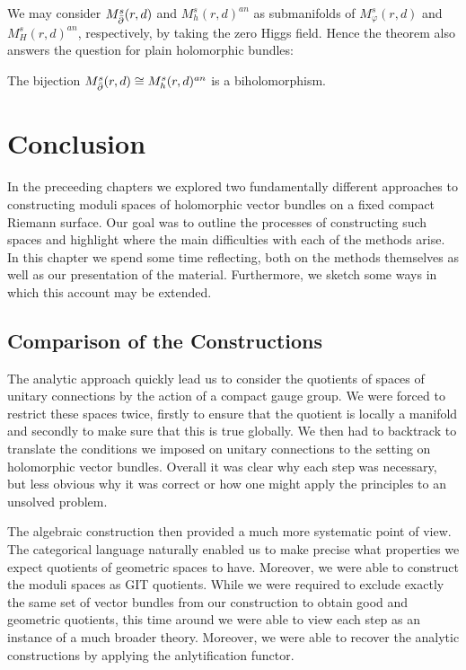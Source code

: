 \documentclass[12pt]{ociamthesis}  %
\begin{document}
We may consider $M^s_{\bar{\partial}}(r,d)$ and $M^s_h(r,d)^{an}$ as submanifolds
of $M^s_\varphi(r,d)$ and $M^s_H(r,d)^{an}$, respectively, by taking
the zero Higgs field. Hence the theorem also answers the question for plain
holomorphic bundles:

\begin{corollary}
  The bijection
  $M^s_{\bar{\partial}}(r,d) \cong M^s_h(r,d)^{an}$
  is a biholomorphism.
\end{corollary}

\chapter{Conclusion}

In the preceeding chapters we explored two fundamentally different
approaches to constructing moduli spaces of holomorphic vector
bundles on a fixed compact Riemann surface. Our goal was to
outline the processes of constructing such spaces and highlight where
the main difficulties with each of the methods arise.
In this chapter we spend some time reflecting, both on the methods
themselves as well as our presentation of the material.
Furthermore, we sketch some ways in which this account may be
extended.

\section{Comparison of the Constructions}


The analytic approach
quickly lead us to consider the quotients of spaces of unitary connections
by the action of a compact gauge group. We were forced to restrict these
spaces twice, firstly to ensure that the quotient is locally a manifold
and secondly to make sure that this is true globally. We then had to
backtrack to translate the conditions we imposed on unitary connections
to the setting on holomorphic vector bundles. Overall it was clear
why each step was necessary, but less obvious why it was correct or
how one might apply the principles to an unsolved problem.

The algebraic construction then provided a much more systematic
point of view. The categorical language naturally enabled us to make
precise what properties we expect quotients of geometric spaces to
have. Moreover, we were able to construct the moduli spaces as GIT
quotients. While we were required to exclude exactly the same set of
vector bundles from our construction to obtain good and geometric
quotients, this time around we were able to view each step as an
instance of a much broader theory. Moreover, we were able to recover
the analytic constructions by applying the anlytification functor.
\end{document}
